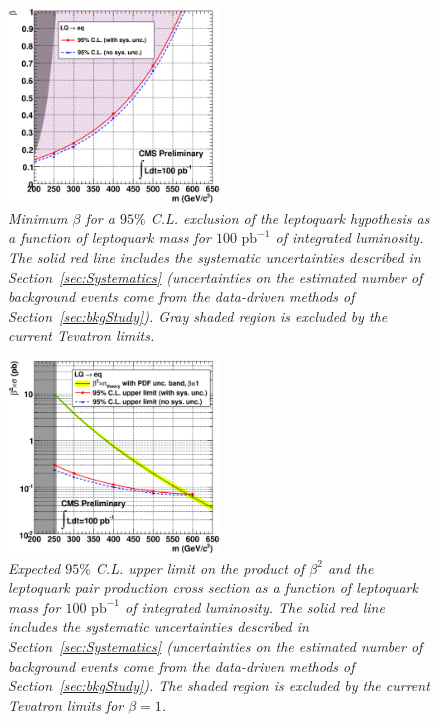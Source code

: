 \begin{figure}[h!]
 \centering
  \includegraphics[width=0.5\textwidth]{plots/cmsPotential/beta_vs_m_excl.eps}
 \caption{\small \sl Minimum $\beta$ for
a $95\%$ C.L. exclusion of the leptoquark hypothesis as a function of leptoquark mass for $100\text{ pb}^{-1}$ of integrated luminosity. 
The solid red line includes the systematic uncertainties described in Section~\ref{sec:Systematics}
(uncertainties on the estimated number of background events come from the data-driven methods of Section~\ref{sec:bkgStudy}).
Gray shaded region is excluded by the current Tevatron limits.
\label{fig:exclusion_beta}}
\end{figure}


\begin{figure}[h!]
 \centering
  \includegraphics[width=0.5\textwidth]{plots/cmsPotential/xs95CL_vs_m_log.eps}
 \caption{\small \sl Expected $95\%$ C.L. upper limit on the product of $\beta^2$ and the leptoquark pair production cross section 
as a function of leptoquark mass for $100\text{ pb}^{-1}$ of integrated luminosity. 
The solid red line includes the systematic uncertainties described in Section~\ref{sec:Systematics}
(uncertainties on the estimated number of background events come from the data-driven methods of Section~\ref{sec:bkgStudy}).
The shaded region is excluded by the current Tevatron limits for $\beta=1$.
\label{fig:exclusion_xs}}
\end{figure}


